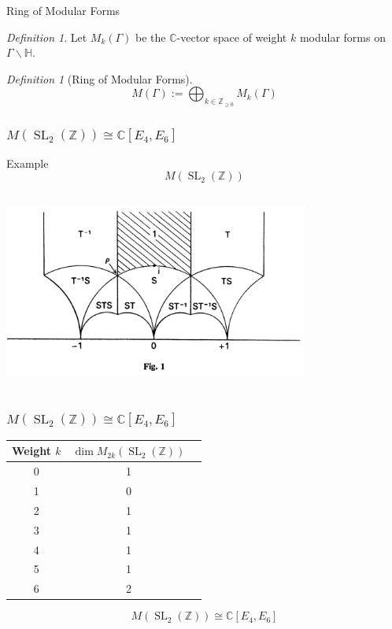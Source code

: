 \documentclass{beamer}
\theoremstyle{remark}
\newtheorem{defn}[thm]{Definition}
\newcommand\BC{{\mathbb C}}
\newcommand\BBZ{{\mathbb Z}}
\newcommand\BZ{{\mathbb Z}}
\newcommand{\SL}{\operatorname{SL}}
\begin{document}

\begin{frame}{Ring of Modular Forms}

\begin{defn}
  Let $M_k(\Gamma)$ be the $\BC$-vector space of weight $k$ modular forms on $\Gamma \backslash \mathbb{H}$.
\end{defn}

\begin{defn}[Ring of Modular Forms]
\[
	M(\Gamma) := \bigoplus_{k \in \BZ_{\geq 0}} M_k(\Gamma)
\]
\end{defn}

\end{frame}


\begin{frame}
\frametitle{$M(\SL_2(\BZ)) \cong \BC[E_4,E_6]$}

\begin{block}{Example}
\[
	M(\SL_2(\BZ))
\]
\end{block}

  \begin{center}
    \includegraphics[width=10cm, height=6.5cm]{pics/fun-domain-SL2.png}
  \end{center}

\end{frame}


\begin{frame}
\frametitle{$M(\SL_2(\BZ)) \cong \BC[E_4,E_6]$}


\begin{center}
\begin{tabular}{ |c| c| c|}
\hline
Weight $k$  & $\dim M_{2k}(\SL_2(\BBZ))$  \\ 
\hline
0& 1 \\ 
1& 0 \\  
2& 1 \\
3& 1 \\
4& 1 \\
5& 1 \\
6& 2 \\
\hline
\end{tabular}
\end{center}

\[
	M(\SL_2(\BZ)) \cong \BC[E_4,E_6]
\]
\end{frame}
\end{document}

